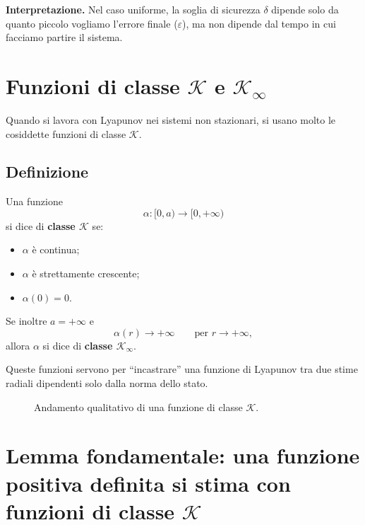 \medskip

\noindent
\textbf{Interpretazione.}
Nel caso uniforme, la soglia di sicurezza \(\delta\) dipende solo da quanto piccolo vogliamo l'errore finale (\(\varepsilon\)), ma non dipende dal tempo in cui facciamo partire il sistema.

\section{Funzioni di classe \(\mathcal K\) e \(\mathcal K_\infty\)}

Quando si lavora con Lyapunov nei sistemi non stazionari, si usano molto le cosiddette funzioni di classe \(\mathcal K\).

\subsection{Definizione}

Una funzione
\[
\alpha:[0,a)\to [0,+\infty)
\]
si dice di \textbf{classe \(\mathcal K\)} se:
\begin{itemize}
    \item \(\alpha\) \`e continua;
    \item \(\alpha\) \`e strettamente crescente;
    \item \(\alpha(0)=0\).
\end{itemize}

Se inoltre \(a=+\infty\) e
\[
\alpha(r)\to +\infty
\qquad \text{per } r\to+\infty,
\]
allora \(\alpha\) si dice di \textbf{classe \(\mathcal K_\infty\)}.

\medskip

\noindent
Queste funzioni servono per ``incastrare'' una funzione di Lyapunov tra due stime radiali dipendenti solo dalla norma dello stato.

\begin{figure}[h!]
\centering
{}
\caption{Andamento qualitativo di una funzione di classe \(\mathcal K\).}
\end{figure}

\section{Lemma fondamentale: una funzione positiva definita si stima con funzioni di classe \(\mathcal K\)}

